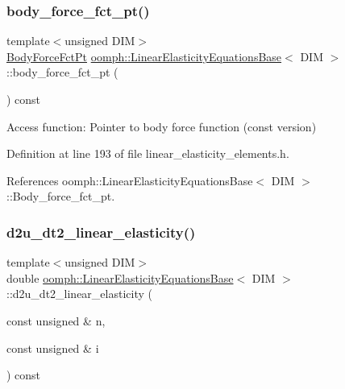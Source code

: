 \subsubsection{\texorpdfstring{body\+\_\+force\+\_\+fct\+\_\+pt()}{body\_force\_fct\_pt()}\hspace{0.1cm}{\footnotesize\ttfamily [2/2]}}
{\footnotesize\ttfamily template$<$unsigned D\+IM$>$ \\
\hyperlink{classoomph_1_1LinearElasticityEquationsBase_ada2fc7aa2569c35e28982f93a0749903}{Body\+Force\+Fct\+Pt} \hyperlink{classoomph_1_1LinearElasticityEquationsBase}{oomph\+::\+Linear\+Elasticity\+Equations\+Base}$<$ D\+IM $>$\+::body\+\_\+force\+\_\+fct\+\_\+pt (\begin{DoxyParamCaption}{ }\end{DoxyParamCaption}) const\hspace{0.3cm}{\ttfamily [inline]}}



Access function\+: Pointer to body force function (const version) 



Definition at line 193 of file linear\+\_\+elasticity\+\_\+elements.\+h.



References oomph\+::\+Linear\+Elasticity\+Equations\+Base$<$ D\+I\+M $>$\+::\+Body\+\_\+force\+\_\+fct\+\_\+pt.

\mbox{\label{classoomph_1_1LinearElasticityEquationsBase_af281baa2a69dd8c52678dc04e4273ff0}} 
\subsubsection{\texorpdfstring{d2u\+\_\+dt2\+\_\+linear\+\_\+elasticity()}{d2u\_dt2\_linear\_elasticity()}}
{\footnotesize\ttfamily template$<$unsigned D\+IM$>$ \\
double \hyperlink{classoomph_1_1LinearElasticityEquationsBase}{oomph\+::\+Linear\+Elasticity\+Equations\+Base}$<$ D\+IM $>$\+::d2u\+\_\+dt2\+\_\+linear\+\_\+elasticity (\begin{DoxyParamCaption}\item[{const unsigned \&}]{n,  }\item[{const unsigned \&}]{i }\end{DoxyParamCaption}) const\hspace{0.3cm}{\ttfamily [inline]}}



